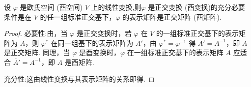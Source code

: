 \documentclass[../../main.tex]{subfiles}
\begin{document}
\begin{theorem}\label{theorem:正交变换和酉变换关于表示矩阵的充要条件}
设 $\varphi$ 是欧氏空间 (酉空间) $V$ 上的线性变换,则$\varphi$ 是正交变换 (酉变换)的充分必要条件是在 $V$ 的任一组标准正交基下，$\varphi$ 的表示矩阵是正交矩阵 (酉矩阵).
\end{theorem}
\begin{proof}
必要性:由，当 $\varphi$ 是正交变换时，若 $\varphi$ 在 $V$ 的一组标准正交基下的表示矩阵为 $A$，则 $\varphi^*$ 在同一组基下的表示矩阵为 $A'$，由 $\varphi^* = \varphi^{-1}$ 得 $A' = A^{-1}$，即 $A$ 是正交矩阵. 同理，当 $\varphi$ 是酉变换时，$\varphi$ 在一组标准正交基下的表示矩阵 $A$ 应适合 $\overline{A}' = A^{-1}$，即 $A$ 是酉矩阵.

充分性:这由线性变换与其表示矩阵的关系即得.

\end{proof}
\end{document}
